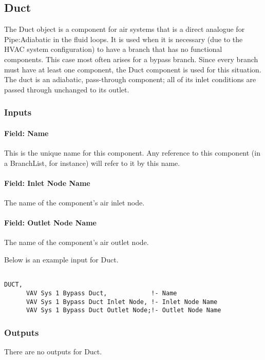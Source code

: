 \subsection{Duct}\label{duct}

The Duct object is a component for air systems that is a direct analogue for Pipe:Adiabatic in the fluid loops. It is used when it is necessary (due to the HVAC system configuration) to have a branch that has no functional components. This case most often arises for a bypass branch. Since every branch must have at least one component, the Duct component is used for this situation. The duct is an adiabatic, pass-through component; all of its inlet conditions are passed through unchanged to its outlet.

\subsubsection{Inputs}\label{inputs-12-009}

\paragraph{Field: Name}\label{field-name-12-006}

This is the unique name for this component. Any reference to this component (in a BranchList, for instance) will refer to it by this name.

\paragraph{Field: Inlet Node Name}\label{field-inlet-node-name-2-000}

The name of the component's air inlet node.

\paragraph{Field: Outlet Node Name}\label{field-outlet-node-name-2-000}

The name of the component's air outlet node.

Below is an example input for Duct.

\begin{lstlisting}

DUCT,
      VAV Sys 1 Bypass Duct,            !- Name
      VAV Sys 1 Bypass Duct Inlet Node, !- Inlet Node Name
      VAV Sys 1 Bypass Duct Outlet Node;!- Outlet Node Name
\end{lstlisting}

\subsubsection{Outputs}\label{outputs-10-004}

There are no outputs for Duct.
